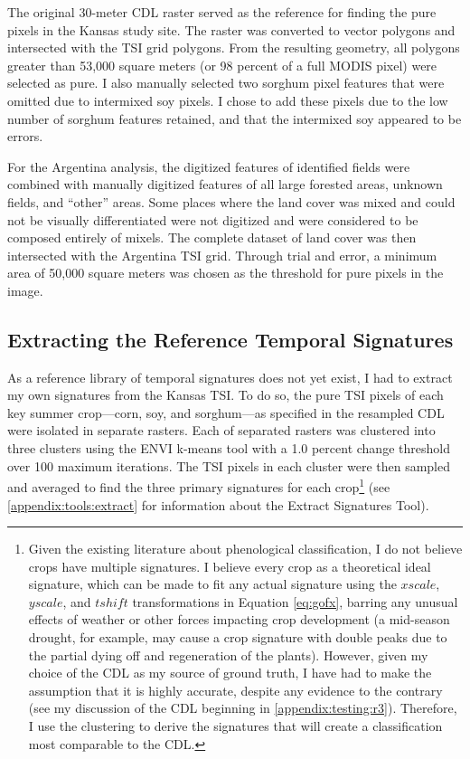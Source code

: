 The original 30-meter CDL raster served as the reference for finding the pure pixels in the Kansas study site. The raster was converted to vector polygons and intersected with the TSI grid polygons. From the resulting geometry, all polygons greater than 53,000 square meters (or 98 percent of a full MODIS pixel) were selected as pure. I also manually selected two sorghum pixel features that were omitted due to intermixed soy pixels. I chose to add these pixels due to the low number of sorghum features retained, and that the intermixed soy appeared to be errors.

For the Argentina analysis, the digitized features of identified fields were combined with manually digitized features of all large forested areas, unknown fields, and ``other'' areas. Some places where the land cover was mixed and could not be visually differentiated were not digitized and were considered to be composed entirely of mixels. The complete dataset of land cover was then intersected with the Argentina TSI grid. Through trial and error, a minimum area of 50,000 square meters was chosen as the threshold for pure pixels in the image.

\subsection{Extracting the Reference Temporal Signatures}

As a reference library of temporal signatures does not yet exist, I had to extract my own signatures from the Kansas TSI. To do so, the pure TSI pixels of each key summer crop---corn, soy, and sorghum---as specified in the resampled CDL were isolated in separate rasters. Each of separated rasters was clustered into three clusters using the ENVI \autocite{envi5.0} k-means tool with a 1.0 percent change threshold over 100 maximum iterations. The TSI pixels in each cluster were then sampled and averaged to find the three primary signatures for each crop\footnote{Given the existing literature about phenological classification, I do not believe crops have multiple signatures. I believe every crop as a theoretical ideal signature, which can be made to fit any actual signature using the $xscale$, $yscale$, and $tshift$ transformations in Equation \ref{eq:gofx}, barring any unusual effects of weather or other forces impacting crop development (a mid-season drought, for example, may cause a crop signature with double peaks due to the partial dying off and regeneration of the plants). However, given my choice of the CDL as my source of ground truth, I have had to make the assumption that it is highly accurate, despite any evidence to the contrary (see my discussion of the CDL beginning in \autoref{appendix:testing:r3}). Therefore, I use the clustering to derive the signatures that will create a classification most comparable to the CDL.} (see \autoref{appendix:tools:extract} for information about the Extract Signatures Tool).

